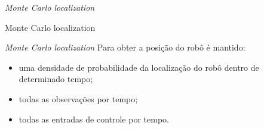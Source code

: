 \begin{frame}[c]{\textit{Monte Carlo localization}}
    \begin{center}
    
            
            Monte Carlo localization\cite{Montec41:online}
    \end{center}

 \end{frame}
\begin{frame}[c]{\textit{Monte Carlo localization}}
    Para obter a posição do robô é mantido:

    \begin{itemize}
        \item uma densidade de probabilidade da localização do robô dentro de determinado tempo;
        \item todas as observações por tempo;
        \item todas as entradas de controle por tempo.
    \end{itemize}

\end{frame}

